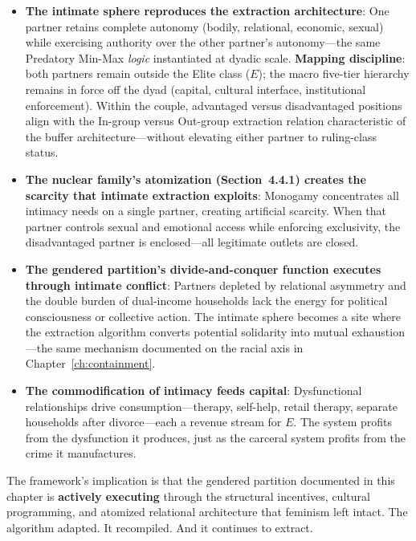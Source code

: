 \begin{itemize}
    \item \textbf{The intimate sphere reproduces the extraction architecture}: One partner retains complete autonomy (bodily, relational, economic, sexual) while exercising authority over the other partner's autonomy---the same Predatory Min-Max \textit{logic} instantiated at dyadic scale. \textbf{Mapping discipline}: both partners remain outside the Elite class ($E$); the macro five-tier hierarchy remains in force off the dyad (capital, cultural interface, institutional enforcement). Within the couple, advantaged versus disadvantaged positions align with the In-group versus Out-group extraction relation characteristic of the buffer architecture---without elevating either partner to ruling-class status.
    
    \item \textbf{The nuclear family's atomization (Section~4.4.1) creates the scarcity that intimate extraction exploits}: Monogamy concentrates all intimacy needs on a single partner, creating artificial scarcity. When that partner controls sexual and emotional access while enforcing exclusivity, the disadvantaged partner is enclosed---all legitimate outlets are closed.
    
    \item \textbf{The gendered partition's divide-and-conquer function executes through intimate conflict}: Partners depleted by relational asymmetry and the double burden of dual-income households lack the energy for political consciousness or collective action. The intimate sphere becomes a site where the extraction algorithm converts potential solidarity into mutual exhaustion---the same mechanism documented on the racial axis in Chapter~\ref{ch:containment}.
    
    \item \textbf{The commodification of intimacy feeds capital}: Dysfunctional relationships drive consumption---therapy, self-help, retail therapy, separate households after divorce---each a revenue stream for $E$. The system profits from the dysfunction it produces, just as the carceral system profits from the crime it manufactures.
\end{itemize}

The framework's implication is that the gendered partition documented in this chapter is \textbf{actively executing} through the structural incentives, cultural programming, and atomized relational architecture that feminism left intact. The algorithm adapted. It recompiled. And it continues to extract.

